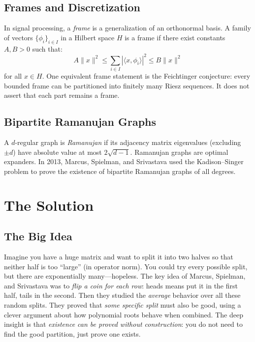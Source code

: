 \subsection{Frames and Discretization}
In signal processing, a \emph{frame} is a generalization of an orthonormal basis. A family of vectors $\{\phi_i\}_{i \in I}$ in a Hilbert space $H$ is a frame if there exist constants $A, B > 0$ such that:
\begin{equation}
A \|x\|^2 \leq \sum_{i \in I} |\langle x, \phi_i \rangle|^2 \leq B \|x\|^2
\end{equation}
for all $x \in H$. One equivalent frame statement is the Feichtinger conjecture: every bounded frame can be partitioned into finitely many Riesz sequences. It does not assert that each part remains a frame.

\subsection{Bipartite Ramanujan Graphs}
A $d$-regular graph is \emph{Ramanujan} if its adjacency matrix eigenvalues (excluding $\pm d$) have absolute value at most $2\sqrt{d-1}$. Ramanujan graphs are optimal expanders. In 2013, Marcus, Spielman, and Srivastava used the Kadison--Singer problem to prove the existence of bipartite Ramanujan graphs of all degrees.

\section{The Solution}

\subsection{The Big Idea}
Imagine you have a huge matrix and want to split it into two halves so that neither half is too ``large'' (in operator norm). You could try every possible split, but there are exponentially many---hopeless. The key idea of Marcus, Spielman, and Srivastava was to \emph{flip a coin for each row}: heads means put it in the first half, tails in the second. Then they studied the \emph{average} behavior over all these random splits. They proved that \emph{some specific split} must also be good, using a clever argument about how polynomial roots behave when combined. The deep insight is that \emph{existence can be proved without construction}: you do not need to find the good partition, just prove one exists.

